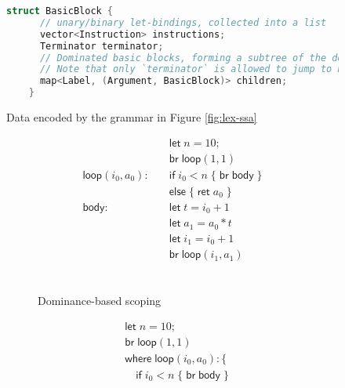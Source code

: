 \documentclass[acmsmall,screen,review]{acmart}
\newcommand{\ms}[1]{\ensuremath{\mathsf{#1}}}
\begin{document}
\begin{figure}
  \begin{lstlisting}[language=C++]
    struct BasicBlock {
      // unary/binary let-bindings, collected into a list
      vector<Instruction> instructions;             
      Terminator terminator;                        
      // Dominated basic blocks, forming a subtree of the dominance tree
      // Note that only `terminator` is allowed to jump to blocks in `children`
      map<Label, (Argument, BasicBlock)> children;  
    }
  \end{lstlisting}
  \caption{Data encoded by the grammar in Figure \ref{fig:lex-ssa}}
  \Description{}
  \label{fig:ssa-data}
\end{figure}

\begin{figure}
  \centering
  \begin{subfigure}[t]{.5\textwidth}
    \begin{align*}
                                  & \ms{let}\;n = 10; \\
                                  & \ms{br}\;\ms{loop}(1, 1) \\
      \ms{loop}(i_0, a_0): \quad  & \ms{if}\;i_0 < n\; \{\;\ms{br}\;\ms{body}\;\} \\
                                  & \ms{else}\;\{\;\ms{ret}\;a_0\;\} \\
      \ms{body}: \quad            & \ms{let}\;t = i_0 + 1 \\
                                  & \ms{let}\;a_1 = a_0 * t \\
                                  & \ms{let}\;i_1 = i_0 + 1 \\
                                  & \ms{br}\;\ms{loop}(i_1, a_1) \\ \\ \\ \\ 
    \end{align*}
    \caption{Dominance-based scoping}
  \end{subfigure}%
  \begin{subfigure}[t]{.5\textwidth}
    \begin{align*}
      & \ms{let}\;n = 10; \\
      & \ms{br}\;\ms{loop}(1, 1) \\
      & \ms{where}\;\ms{loop}(i_0, a_0): \{ \\
      & \quad \ms{if}\;i_0 < n\;\{\;\ms{br}\;\ms{body}\;\} \\

\end{align*}
\end{subfigure}
\end{figure}
\end{document}
